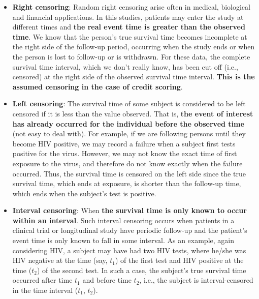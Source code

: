 \documentclass[]{book}
\theoremstyle{definition}
\theoremstyle{definition}
\theoremstyle{definition}
\theoremstyle{remark}
\begin{document}
\begin{itemize}
\item
  \textbf{Right censoring}: Random right censoring arise often in
  medical, biological and financial applications. In this studies,
  patients may enter the study at different times and \textbf{the real
  event time is greater than the observed time}. We know that the
  person's true survival time becomes incomplete at the right side of
  the follow-up period, occurring when the study ends or when the person
  is lost to follow-up or is withdrawn. For these data, the complete
  survival time interval, which we don't really know, has been cut off
  (i.e., censored) at the right side of the observed survival time
  interval. \textbf{This is the assumed censoring in the case of credit
  scoring}.
\item
  \textbf{Left censoring}: The survival time of some subject is
  considered to be left censored if it is less than the value observed.
  That is, \textbf{the event of interest has already occurred for the
  individual before the observed time} (not easy to deal with). For
  example, if we are following persons until they become HIV positive,
  we may record a failure when a subject first tests positive for the
  virus. However, we may not know the exact time of first exposure to
  the virus, and therefore do not know exactly when the failure
  occurred. Thus, the survival time is censored on the left side since
  the true survival time, which ends at exposure, is shorter than the
  follow-up time, which ends when the subject's test is positive.
\item
  \textbf{Interval censoring}: When \textbf{the survival time is only
  known to occur within an interval}. Such interval censoring occurs
  when patients in a clinical trial or longitudinal study have periodic
  follow-up and the patient's event time is only known to fall in some
  interval. As an example, again considering HIV, a subject may have had
  two HIV tests, where he/she was HIV negative at the time (say,
  \(t_1\)) of the first test and HIV positive at the time (\(t_2\)) of
  the second test. In such a case, the subject's true survival time
  occurred after time \(t_1\) and before time \(t_2\), i.e., the subject
  is interval-censored in the time interval (\(t_1\), \(t_2\)).
\end{itemize}
\end{document}
